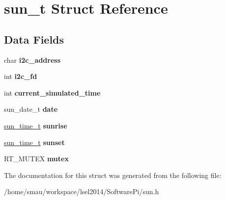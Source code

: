 \hypertarget{structsun__t}{\section{sun\-\_\-t Struct Reference}
\label{structsun__t}
}
\subsection*{Data Fields}
\begin{DoxyCompactItemize}
\item 
\hypertarget{structsun__t_a8e03db45d360669cba100a0fe3445fca}{char {\bfseries i2c\-\_\-address}}\label{structsun__t_a8e03db45d360669cba100a0fe3445fca}

\item 
\hypertarget{structsun__t_a0d3cd0b18e49aa09b8659af0243558b8}{int {\bfseries i2c\-\_\-fd}}\label{structsun__t_a0d3cd0b18e49aa09b8659af0243558b8}

\item 
\hypertarget{structsun__t_ae59e216e84b13dbba2af5c721690b5d4}{int {\bfseries current\-\_\-simulated\-\_\-time}}\label{structsun__t_ae59e216e84b13dbba2af5c721690b5d4}

\item 
\hypertarget{structsun__t_aa1c742f06f54307d592846f7ca57e169}{sun\-\_\-date\-\_\-t {\bfseries date}}\label{structsun__t_aa1c742f06f54307d592846f7ca57e169}

\item 
\hypertarget{structsun__t_a1f5068d1921a39f0de857b9ac86b6064}{\hyperlink{structsun__time__t}{sun\-\_\-time\-\_\-t} {\bfseries sunrise}}\label{structsun__t_a1f5068d1921a39f0de857b9ac86b6064}

\item 
\hypertarget{structsun__t_ab5f2acf9c038544cf25b17efed70a398}{\hyperlink{structsun__time__t}{sun\-\_\-time\-\_\-t} {\bfseries sunset}}\label{structsun__t_ab5f2acf9c038544cf25b17efed70a398}

\item 
\hypertarget{structsun__t_a026a0d348095315f97ca47409a2b8ee2}{R\-T\-\_\-\-M\-U\-T\-E\-X {\bfseries mutex}}\label{structsun__t_a026a0d348095315f97ca47409a2b8ee2}

\end{DoxyCompactItemize}


The documentation for this struct was generated from the following file\-:\begin{DoxyCompactItemize}
\item 
/home/smau/workspace/lsel2014/\-Software\-Pi/sun.\-h\end{DoxyCompactItemize}

